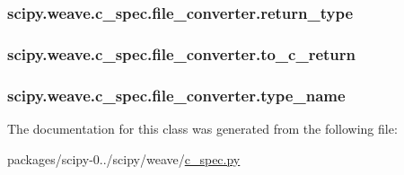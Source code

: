\subsubsection[{return\+\_\+type}]{\setlength{\rightskip}{0pt plus 5cm}scipy.\+weave.\+c\+\_\+spec.\+file\+\_\+converter.\+return\+\_\+type}\label{classscipy_1_1weave_1_1c__spec_1_1file__converter_a316c480a6c03c2282bf6044298ad2a51}
\hypertarget{classscipy_1_1weave_1_1c__spec_1_1file__converter_a025123a536d56643eed420d0efce3a10}{}
\subsubsection[{to\+\_\+c\+\_\+return}]{\setlength{\rightskip}{0pt plus 5cm}scipy.\+weave.\+c\+\_\+spec.\+file\+\_\+converter.\+to\+\_\+c\+\_\+return}\label{classscipy_1_1weave_1_1c__spec_1_1file__converter_a025123a536d56643eed420d0efce3a10}
\hypertarget{classscipy_1_1weave_1_1c__spec_1_1file__converter_acaaf2e501ece970679516c12d4b5e54d}{}
\subsubsection[{type\+\_\+name}]{\setlength{\rightskip}{0pt plus 5cm}scipy.\+weave.\+c\+\_\+spec.\+file\+\_\+converter.\+type\+\_\+name}\label{classscipy_1_1weave_1_1c__spec_1_1file__converter_acaaf2e501ece970679516c12d4b5e54d}


The documentation for this class was generated from the following file\+:\begin{DoxyCompactItemize}
\item 
packages/scipy-\/0../scipy/weave/\hyperlink{c__spec_8py}{c\+\_\+spec.\+py}\end{DoxyCompactItemize}
